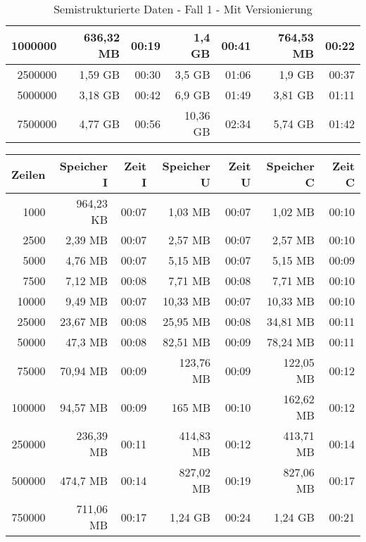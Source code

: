 \begin{table}[h!]
\begin{tabular}{|r|r|r|r|r|r|r|}
        1000000 & 636,32 MB & 00:19 & 1,4 GB    & 00:41 & 764,53 MB & 00:22 \\ \hline
        2500000 & 1,59 GB   & 00:30 & 3,5 GB    & 01:06 & 1,9 GB    & 00:37 \\ \hline
        5000000 & 3,18 GB   & 00:42 & 6,9 GB    & 01:49 & 3,81 GB   & 01:11 \\ \hline
        7500000 & 4,77 GB   & 00:56 & 10,36 GB  & 02:34 & 5,74 GB   & 01:42 \\ \hline
    \end{tabular}
    \caption{Semistrukturierte Daten - Fall 1 - Mit Versionierung}
    \label{tab:sql-80-20-40-cdc}
\end{table}

\begin{table}[h!]
    \centering
    \begin{tabular}{|r|r|r|r|r|r|r|}
        \hline
        \textbf{Zeilen} & \textbf{Speicher I} & \textbf{Zeit I} & \textbf{Speicher U} & \textbf{Zeit U} & \textbf{Speicher C} & \textbf{Zeit C} \\ \hline
        1000    & 964,23 KB & 00:07 & 1,03 MB   & 00:07 & 1,02 MB   & 00:10 \\ \hline
        2500    & 2,39 MB   & 00:07 & 2,57 MB   & 00:07 & 2,57 MB   & 00:10 \\ \hline
        5000    & 4,76 MB   & 00:07 & 5,15 MB   & 00:07 & 5,15 MB   & 00:09 \\ \hline
        7500    & 7,12 MB   & 00:08 & 7,71 MB   & 00:08 & 7,71 MB   & 00:10 \\ \hline
        10000   & 9,49 MB   & 00:07 & 10,33 MB  & 00:07 & 10,33 MB  & 00:10 \\ \hline
        25000   & 23,67 MB  & 00:08 & 25,95 MB  & 00:08 & 34,81 MB  & 00:11 \\ \hline
        50000   & 47,3 MB   & 00:08 & 82,51 MB  & 00:09 & 78,24 MB  & 00:11 \\ \hline
        75000   & 70,94 MB  & 00:09 & 123,76 MB & 00:09 & 122,05 MB & 00:12 \\ \hline
        100000  & 94,57 MB  & 00:09 & 165 MB    & 00:10 & 162,62 MB & 00:12 \\ \hline
        250000  & 236,39 MB & 00:11 & 414,83 MB & 00:12 & 413,71 MB & 00:14 \\ \hline
        500000  & 474,7 MB  & 00:14 & 827,02 MB & 00:19 & 827,06 MB & 00:17 \\ \hline
        750000  & 711,06 MB & 00:17 & 1,24 GB   & 00:24 & 1,24 GB   & 00:21 \\ \hline

\end{tabular}
\end{table}
